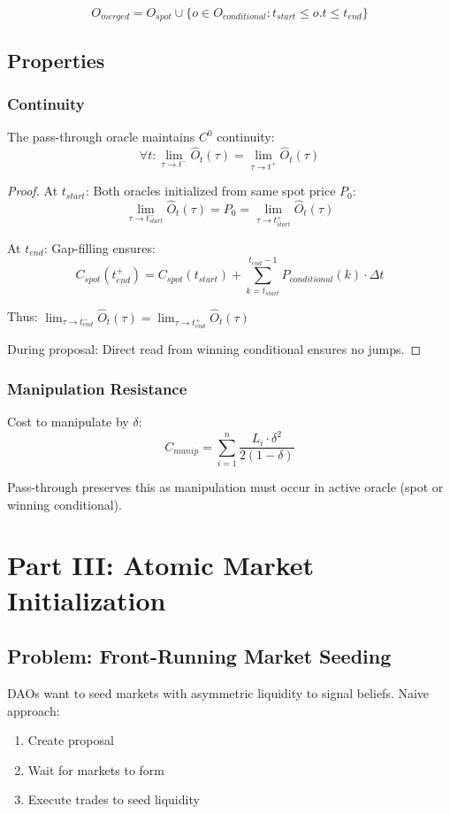 \documentclass{article}
\begin{document}
$$O_{merged} = O_{spot} \cup \{o \in O_{conditional} : t_{start} \leq o.t \leq t_{end}\}$$

\subsection{Properties}

\subsubsection{Continuity}
\begin{theorem}
The pass-through oracle maintains $C^0$ continuity:
$$\forall t: \lim_{\tau \to t^-} \hat{O}_t(\tau) = \lim_{\tau \to t^+} \hat{O}_t(\tau)$$
\end{theorem}

\begin{proof}
At $t_{start}$: Both oracles initialized from same spot price $P_0$:
$$\lim_{\tau \to t_{start}^-} \hat{O}_t(\tau) = P_0 = \lim_{\tau \to t_{start}^+} \hat{O}_t(\tau)$$

At $t_{end}$: Gap-filling ensures:
$$C_{spot}(t_{end}^+) = C_{spot}(t_{start}) + \sum_{k=t_{start}}^{t_{end}-1} P_{conditional}(k) \cdot \Delta t$$

Thus: $\lim_{\tau \to t_{end}^-} \hat{O}_t(\tau) = \lim_{\tau \to t_{end}^+} \hat{O}_t(\tau)$

During proposal: Direct read from winning conditional ensures no jumps.
\end{proof}

\subsubsection{Manipulation Resistance}
Cost to manipulate by $\delta$:
$$C_{manip} = \sum_{i=1}^{n} \frac{L_i \cdot \delta^2}{2(1-\delta)}$$

Pass-through preserves this as manipulation must occur in active oracle (spot or winning conditional).

\section{Part III: Atomic Market Initialization}

\subsection{Problem: Front-Running Market Seeding}

DAOs want to seed markets with asymmetric liquidity to signal beliefs. Naive approach:
\begin{enumerate}
\item Create proposal
\item Wait for markets to form
\item Execute trades to seed liquidity
\end{enumerate}
\end{document}
